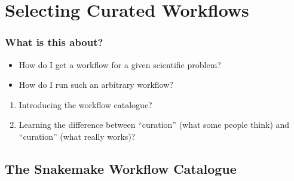\section{Selecting Curated Workflows}
{   
}


\begin{frame}
  \frametitle{What is this about?}
   \begin{question}[Questions]
   	 \begin{itemize}
       \item How do I get a workflow for a given scientific problem?
       \item How do I run such an arbitrary workflow?
     \end{itemize}
   \end{question} 
   \begin{docs}[Objectives]
   	  \begin{enumerate}
                      \item Introducing the workflow catalogue?
                      \item Learning the difference between ``curation'' (what some people think) and ``curation'' (what really works)?
      \end{enumerate}
    \end{docs}
\end{frame}  

\subsection{The Snakemake Workflow Catalogue}

